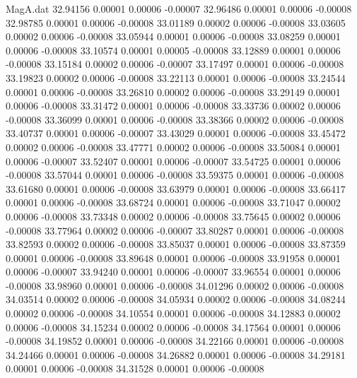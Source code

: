 \begin{filecontents}{MagA.dat}
  32.94156    0.00001    0.00006   -0.00007
  32.96486    0.00001    0.00006   -0.00008
  32.98785    0.00001    0.00006   -0.00008
  33.01189    0.00002    0.00006   -0.00008
  33.03605    0.00002    0.00006   -0.00008
  33.05944    0.00001    0.00006   -0.00008
  33.08259    0.00001    0.00006   -0.00008
  33.10574    0.00001    0.00005   -0.00008
  33.12889    0.00001    0.00006   -0.00008
  33.15184    0.00002    0.00006   -0.00007
  33.17497    0.00001    0.00006   -0.00008
  33.19823    0.00002    0.00006   -0.00008
  33.22113    0.00001    0.00006   -0.00008
  33.24544    0.00001    0.00006   -0.00008
  33.26810    0.00002    0.00006   -0.00008
  33.29149    0.00001    0.00006   -0.00008
  33.31472    0.00001    0.00006   -0.00008
  33.33736    0.00002    0.00006   -0.00008
  33.36099    0.00001    0.00006   -0.00008
  33.38366    0.00002    0.00006   -0.00008
  33.40737    0.00001    0.00006   -0.00007
  33.43029    0.00001    0.00006   -0.00008
  33.45472    0.00002    0.00006   -0.00008
  33.47771    0.00002    0.00006   -0.00008
  33.50084    0.00001    0.00006   -0.00007
  33.52407    0.00001    0.00006   -0.00007
  33.54725    0.00001    0.00006   -0.00008
  33.57044    0.00001    0.00006   -0.00008
  33.59375    0.00001    0.00006   -0.00008
  33.61680    0.00001    0.00006   -0.00008
  33.63979    0.00001    0.00006   -0.00008
  33.66417    0.00001    0.00006   -0.00008
  33.68724    0.00001    0.00006   -0.00008
  33.71047    0.00002    0.00006   -0.00008
  33.73348    0.00002    0.00006   -0.00008
  33.75645    0.00002    0.00006   -0.00008
  33.77964    0.00002    0.00006   -0.00007
  33.80287    0.00001    0.00006   -0.00008
  33.82593    0.00002    0.00006   -0.00008
  33.85037    0.00001    0.00006   -0.00008
  33.87359    0.00001    0.00006   -0.00008
  33.89648    0.00001    0.00006   -0.00008
  33.91958    0.00001    0.00006   -0.00007
  33.94240    0.00001    0.00006   -0.00007
  33.96554    0.00001    0.00006   -0.00008
  33.98960    0.00001    0.00006   -0.00008
  34.01296    0.00002    0.00006   -0.00008
  34.03514    0.00002    0.00006   -0.00008
  34.05934    0.00002    0.00006   -0.00008
  34.08244    0.00002    0.00006   -0.00008
  34.10554    0.00001    0.00006   -0.00008
  34.12883    0.00002    0.00006   -0.00008
  34.15234    0.00002    0.00006   -0.00008
  34.17564    0.00001    0.00006   -0.00008
  34.19852    0.00001    0.00006   -0.00008
  34.22166    0.00001    0.00006   -0.00008
  34.24466    0.00001    0.00006   -0.00008
  34.26882    0.00001    0.00006   -0.00008
  34.29181    0.00001    0.00006   -0.00008
  34.31528    0.00001    0.00006   -0.00008

\end{filecontents}
